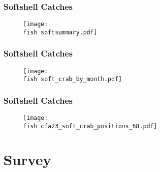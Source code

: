 \documentclass{beamer}
\begin{document}




\begin{frame}
	\frametitle{Softshell Catches}
	\begin{figure}
		
		\vspace*{-.5cm}
		\centerline{\texttt{[image: \\fish softsummary.pdf]}}
		
	\end{figure}
\end{frame}



\begin{frame}
	\frametitle{Softshell Catches}
	\begin{figure}
		
		\vspace*{-.5cm}
		\centerline{\texttt{[image: \\fish soft\_crab\_by\_month.pdf]}}
		
	\end{figure}
\end{frame}

\begin{frame}
	\frametitle{Softshell Catches}
	\begin{figure}
		
		\vspace*{-.5cm}
		\centerline{\texttt{[image: \\fish cfa23\_soft\_crab\_positions\_68.pdf]}}
		
	\end{figure}
\end{frame}

\section{Survey}
\end{document}
